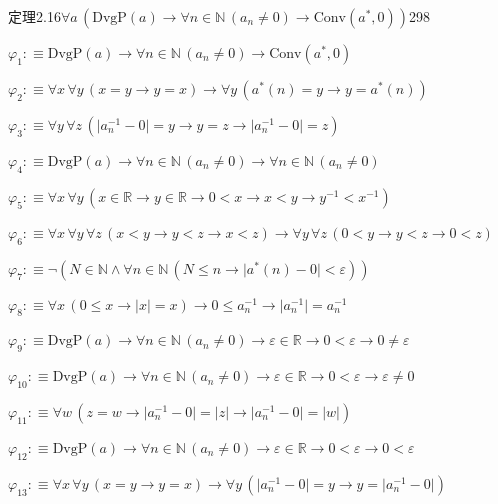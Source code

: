 \begin{fullproof}{定理2.16}{$\forall a\,(\mathrm{DvgP}(a) \to \forall n \in \mathbb{N}\,(a_{n} \neq 0) \to \mathrm{Conv}(a^{\ast},0))$}{298}
\begin{ptree}
\noLine
{}
\end{ptree}
\begin{abbrevlist}
\item $\varphi_{1} :\equiv \mathrm{DvgP}(a) \to \forall n \in \mathbb{N}\,(a_{n} \neq 0) \to \mathrm{Conv}(a^{\ast},0)$
\item $\varphi_{2} :\equiv \forall x\,\forall y\,(x = y \to y = x) \to \forall y\,(a^{\ast}(n) = y \to y = a^{\ast}(n))$
\item $\varphi_{3} :\equiv \forall y\,\forall z\,(\lvert a_{n}^{-1} - 0 \rvert = y \to y = z \to \lvert a_{n}^{-1} - 0 \rvert = z)$
\item $\varphi_{4} :\equiv \mathrm{DvgP}(a) \to \forall n \in \mathbb{N}\,(a_{n} \neq 0) \to \forall n \in \mathbb{N}\,(a_{n} \neq 0)$
\item $\varphi_{5} :\equiv \forall x\,\forall y\,(x \in \mathbb{R} \to y \in \mathbb{R} \to 0 < x \to x < y \to y^{-1} < x^{-1})$
\item $\varphi_{6} :\equiv \forall x\,\forall y\,\forall z\,(x < y \to y < z \to x < z) \to \forall y\,\forall z\,(0 < y \to y < z \to 0 < z)$
\item $\varphi_{7} :\equiv \neg (N \in \mathbb{N} \land \forall n \in \mathbb{N}\,(N \leq n \to \lvert a^{\ast}(n) - 0 \rvert < \varepsilon))$
\item $\varphi_{8} :\equiv \forall x\,(0 \leq x \to \lvert x \rvert = x) \to 0 \leq a_{n}^{-1} \to \lvert a_{n}^{-1} \rvert = a_{n}^{-1}$
\item $\varphi_{9} :\equiv \mathrm{DvgP}(a) \to \forall n \in \mathbb{N}\,(a_{n} \neq 0) \to \varepsilon \in \mathbb{R} \to 0 < \varepsilon \to 0 \neq \varepsilon$
\item $\varphi_{10} :\equiv \mathrm{DvgP}(a) \to \forall n \in \mathbb{N}\,(a_{n} \neq 0) \to \varepsilon \in \mathbb{R} \to 0 < \varepsilon \to \varepsilon \neq 0$
\item $\varphi_{11} :\equiv \forall w\,(z = w \to \lvert a_{n}^{-1} - 0 \rvert = \lvert z \rvert \to \lvert a_{n}^{-1} - 0 \rvert = \lvert w \rvert)$
\item $\varphi_{12} :\equiv \mathrm{DvgP}(a) \to \forall n \in \mathbb{N}\,(a_{n} \neq 0) \to \varepsilon \in \mathbb{R} \to 0 < \varepsilon \to 0 < \varepsilon$
\item $\varphi_{13} :\equiv \forall x\,\forall y\,(x = y \to y = x) \to \forall y\,(\lvert a_{n}^{-1} - 0 \rvert = y \to y = \lvert a_{n}^{-1} - 0 \rvert)$

\end{abbrevlist}
\end{fullproof}

